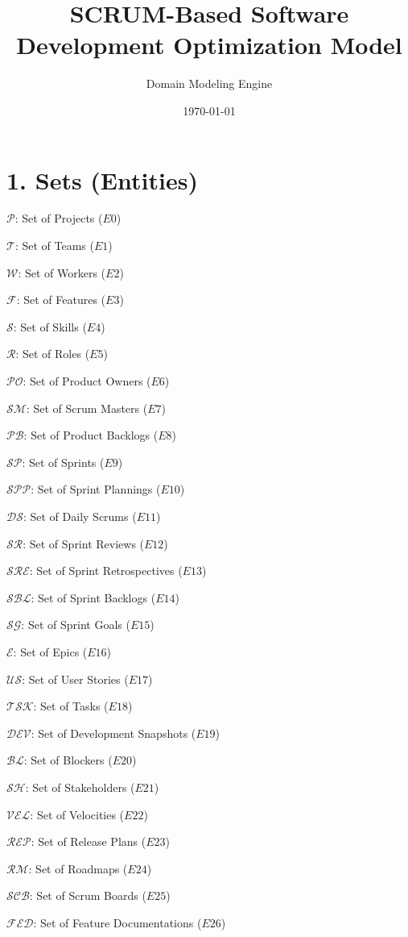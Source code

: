 \documentclass[12pt]{article}
\title{SCRUM-Based Software Development Optimization Model}
\author{Domain Modeling Engine}
\date{\today}
\begin{document}
\maketitle
\tableofcontents
\newpage

\section{1. Sets (Entities)}
\item $\mathcal{P}$: Set of Projects ($E0$)
    \item $\mathcal{T}$: Set of Teams ($E1$)
    \item $\mathcal{W}$: Set of Workers ($E2$)
    \item $\mathcal{F}$: Set of Features ($E3$)
    \item $\mathcal{S}$: Set of Skills ($E4$)
    \item $\mathcal{R}$: Set of Roles ($E5$)
    \item $\mathcal{PO}$: Set of Product Owners ($E6$)
    \item $\mathcal{SM}$: Set of Scrum Masters ($E7$)
    \item $\mathcal{PB}$: Set of Product Backlogs ($E8$)
    \item $\mathcal{SP}$: Set of Sprints ($E9$)
    \item $\mathcal{SPP}$: Set of Sprint Plannings ($E10$)
    \item $\mathcal{DS}$: Set of Daily Scrums ($E11$)
    \item $\mathcal{SR}$: Set of Sprint Reviews ($E12$)
    \item $\mathcal{SRE}$: Set of Sprint Retrospectives ($E13$)
    \item $\mathcal{SBL}$: Set of Sprint Backlogs ($E14$)
    \item $\mathcal{SG}$: Set of Sprint Goals ($E15$)
    \item $\mathcal{E}$: Set of Epics ($E16$)
    \item $\mathcal{US}$: Set of User Stories ($E17$)
    \item $\mathcal{TSK}$: Set of Tasks ($E18$)
    \item $\mathcal{DEV}$: Set of Development Snapshots ($E19$)
    \item $\mathcal{BL}$: Set of Blockers ($E20$)
    \item $\mathcal{SH}$: Set of Stakeholders ($E21$)
    \item $\mathcal{VEL}$: Set of Velocities ($E22$)
    \item $\mathcal{REP}$: Set of Release Plans ($E23$)
    \item $\mathcal{RM}$: Set of Roadmaps ($E24$)
    \item $\mathcal{SCB}$: Set of Scrum Boards ($E25$)
    \item $\mathcal{FED}$: Set of Feature Documentations ($E26$)
\end{document}
